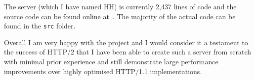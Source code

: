 The server (which I have named HH) is currently 2,437 lines of code and the source code can be found online at~\cite{hh}. The majority of the actual code can be found in the \texttt{src} folder.

Overall I am very happy with the project and I would consider it a testament to the success of HTTP/2 that I have been able to create such a server from scratch with minimal prior experience and still demonstrate large performance improvements over highly optimised HTTP/1.1 implementations.
